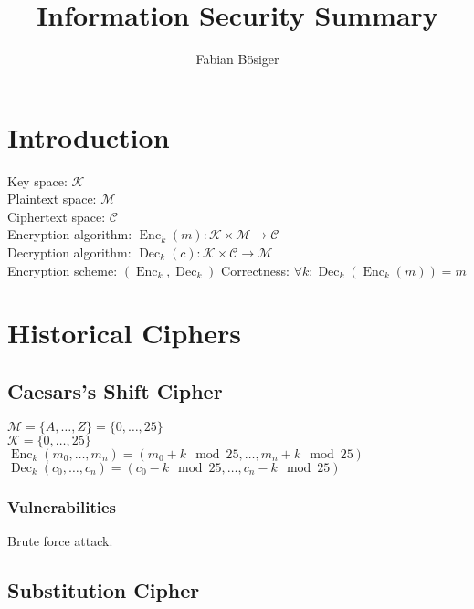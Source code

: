 \documentclass[11pt]{article}
\title{Information Security Summary}
\author{Fabian Bösiger}
\DeclareMathOperator{\Enc}{Enc}
\DeclareMathOperator{\Dec}{Dec}
\begin{document}
    \maketitle
    \newpage

    \tableofcontents
    \newpage

    \section{Introduction}
    
    Key space: $\mathcal{K}$\\
    Plaintext space: $\mathcal{M}$\\
    Ciphertext space: $\mathcal{C}$\\
    Encryption algorithm: $\Enc_k(m): \mathcal{K} \times \mathcal{M} \to \mathcal{C}$\\
    Decryption algorithm: $\Dec_k(c): \mathcal{K} \times \mathcal{C} \to \mathcal{M}$\\
    Encryption scheme: $(\Enc_k, \Dec_k)$
    Correctness: $\forall k: \Dec_k(\Enc_k(m)) = m$

    \section{Historical Ciphers}

    \subsection{Caesars's Shift Cipher}

    $\mathcal{M} = \{A, \dotsc, Z\} = \{0, \dotsc, 25\}$\\
    $\mathcal{K} = \{0, \dotsc, 25\}$\\
    $\Enc_k(m_0, \dotsc, m_n) = (m_0 + k \mod 25, \dotsc, m_n + k \mod 25)$\\
    $\Dec_k(c_0, \dotsc, c_n) = (c_0 - k \mod 25, \dotsc, c_n - k \mod 25)$
    
    \subsubsection{Vulnerabilities}

    Brute force attack.

    \subsection{Substitution Cipher}
\end{document}
